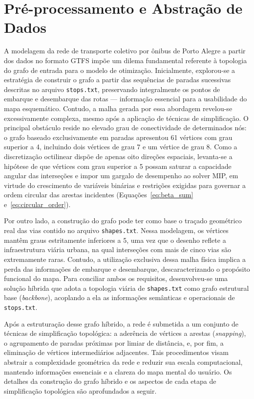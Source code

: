 \documentclass[cic,tc]{infufrgs}
\begin{document}
\section{Pré-processamento e Abstração de Dados}
\label{sec:preprocessamento}

A modelagem da rede de transporte coletivo por ônibus de Porto Alegre a partir dos dados no formato GTFS impõe um dilema fundamental referente à topologia do grafo de entrada para o modelo de otimização. Inicialmente, explorou-se a estratégia de construir o grafo a partir das sequências de paradas sucessivas descritas no arquivo \texttt{stops.txt}, preservando integralmente os pontos de embarque e desembarque das rotas — informação essencial para a usabilidade do mapa esquemático. Contudo, a malha gerada por essa abordagem revelou-se excessivamente complexa, mesmo após a aplicação de técnicas de simplificação. O principal obstáculo reside no elevado grau de conectividade de determinados nós: o grafo baseado exclusivamente em paradas apresentou 61 vértices com grau superior a 4, incluindo dois vértices de grau 7 e um vértice de grau 8. Como a discretização octilinear dispõe de apenas oito direções espaciais, levanta-se a hipótese de que vértices com grau superior a 5 possam saturar a capacidade angular das interseções e impor um gargalo de desempenho ao solver MIP, em virtude do crescimento de variáveis binárias e restrições exigidas para governar a ordem circular das arestas incidentes (Equações~\ref{eq:beta_sum} e~\ref{eq:circular_order}).

Por outro lado, a construção do grafo pode ter como base o traçado geométrico real das vias contido no arquivo \texttt{shapes.txt}. Nessa modelagem, os vértices mantêm graus estritamente inferiores a 5, uma vez que o desenho reflete a infraestrutura viária urbana, na qual interseções com mais de cinco vias são extremamente raras. Contudo, a utilização exclusiva dessa malha física implica a perda das informações de embarque e desembarque, descaracterizando o propósito funcional do mapa. Para conciliar ambos os requisitos, desenvolveu-se uma solução híbrida que adota a topologia viária de \texttt{shapes.txt} como grafo estrutural base (\textit{backbone}), acoplando a ela as informações semânticas e operacionais de \texttt{stops.txt}.

Após a estruturação desse grafo híbrido, a rede é submetida a um conjunto de técnicas de simplificação topológica: a aderência de vértices a arestas (\textit{snapping}), o agrupamento de paradas próximas por limiar de distância, e, por fim, a eliminação de vértices intermediários adjacentes. Tais procedimentos visam abstrair a complexidade geométrica da rede e reduzir sua escala computacional, mantendo informações essenciais e a clareza do mapa mental do usuário. Os detalhes da construção do grafo híbrido e os aspectos de cada etapa de simplificação topológica são aprofundados a seguir.
\end{document}
